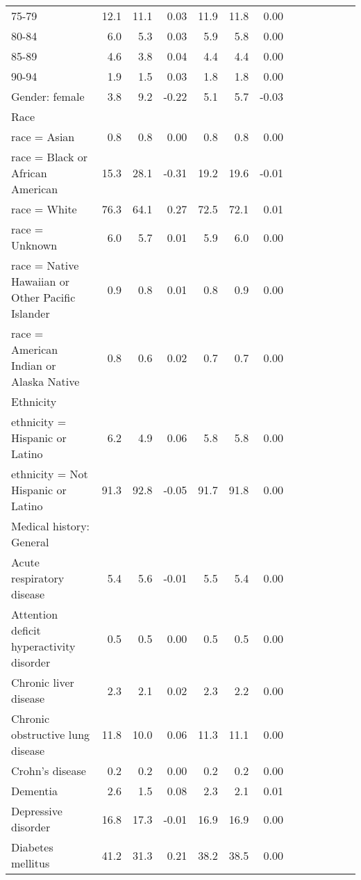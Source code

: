 \documentclass[11pt,]{article}
\begin{document}
\begin{longtable}{lrrrrrrrrrrrr}
      75-79 & 12.1 & 11.1 &  0.03 & 11.9 & 11.8 &  0.00 \\ 
      80-84 &  6.0 &  5.3 &  0.03 &  5.9 &  5.8 &  0.00 \\ 
      85-89 &  4.6 &  3.8 &  0.04 &  4.4 &  4.4 &  0.00 \\ 
      90-94 &  1.9 &  1.5 &  0.03 &  1.8 &  1.8 &  0.00 \\ 
  Gender: female &  3.8 &  9.2 & -0.22 &  5.1 &  5.7 & -0.03 \\ 
  Race &    &    &     &    &    &     \\ 
      race = Asian &  0.8 &  0.8 &  0.00 &  0.8 &  0.8 &  0.00 \\ 
      race = Black or African American & 15.3 & 28.1 & -0.31 & 19.2 & 19.6 & -0.01 \\ 
      race = White & 76.3 & 64.1 &  0.27 & 72.5 & 72.1 &  0.01 \\ 
      race = Unknown &  6.0 &  5.7 &  0.01 &  5.9 &  6.0 &  0.00 \\ 
      race = Native Hawaiian or Other Pacific Islander &  0.9 &  0.8 &  0.01 &  0.8 &  0.9 &  0.00 \\ 
      race = American Indian or Alaska Native &  0.8 &  0.6 &  0.02 &  0.7 &  0.7 &  0.00 \\ 
  Ethnicity &    &    &     &    &    &     \\ 
      ethnicity = Hispanic or Latino &  6.2 &  4.9 &  0.06 &  5.8 &  5.8 &  0.00 \\ 
      ethnicity = Not Hispanic or Latino & 91.3 & 92.8 & -0.05 & 91.7 & 91.8 &  0.00 \\ 
  Medical history: General &    &    &     &    &    &     \\ 
      Acute respiratory disease &  5.4 &  5.6 & -0.01 &  5.5 &  5.4 &  0.00 \\ 
      Attention deficit hyperactivity disorder &  0.5 &  0.5 &  0.00 &  0.5 &  0.5 &  0.00 \\ 
      Chronic liver disease &  2.3 &  2.1 &  0.02 &  2.3 &  2.2 &  0.00 \\ 
      Chronic obstructive lung disease & 11.8 & 10.0 &  0.06 & 11.3 & 11.1 &  0.00 \\ 
      Crohn's disease &  0.2 &  0.2 &  0.00 &  0.2 &  0.2 &  0.00 \\ 
      Dementia &  2.6 &  1.5 &  0.08 &  2.3 &  2.1 &  0.01 \\ 
      Depressive disorder & 16.8 & 17.3 & -0.01 & 16.9 & 16.9 &  0.00 \\ 
      Diabetes mellitus & 41.2 & 31.3 &  0.21 & 38.2 & 38.5 &  0.00 \\ 

\end{longtable}
\end{document}
